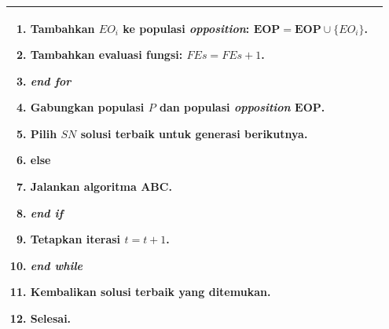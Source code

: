 \begin{table}[H]
\begin{tabular}{|p{0.95\linewidth}|}
\begin{enumerate}[leftmargin=*, label=\arabic*., itemsep=0pt, parsep=0pt]
        \item \hspace{3em} Tambahkan $EO_i$ ke populasi \textit{opposition}: $\mathbf{EOP} = \mathbf{EOP} \cup \{EO_i\}$.
        \item \hspace{3em} Tambahkan evaluasi fungsi: $FEs = FEs + 1$.
        \item \hspace{2em} \textbf{\textit{end for}}
        \item \hspace{2em} Gabungkan populasi $P$ dan populasi \textit{opposition} $\mathbf{EOP}$.
        \item \hspace{2em} Pilih $SN$ solusi terbaik untuk generasi berikutnya.
        \item \hspace{1em} \textbf{else}
        \item \hspace{2em} Jalankan algoritma ABC.
        \item \hspace{1em} \textbf{\textit{end if}}
        \item \hspace{1em} Tetapkan iterasi $t = t + 1$.
        \item \textbf{\textit{end while}}
        \item Kembalikan solusi terbaik yang ditemukan.
        \item Selesai.
    \end{enumerate} \\
    \hline
    \end{tabular}
\end{table}

